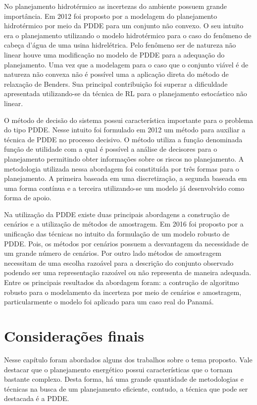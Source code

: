 No planejamento  hidrot\'ermico as incertezas do ambiente possuem grande import\^ancia. Em 2012 foi proposto por
\cite{torres}  a
modelagem do planejamento hidrot\'ermico por meio da PDDE para um conjunto n\~ao convexo. O seu intuito era o
planejamento
utilizando o modelo hidrot\'ermico para o caso do fen\^omeno de cabe\c ca d'\'agua de uma usina hidrel\'etrica. Pelo fen\^omeno ser
de natureza n\~ao linear houve uma modifica\c c\~ao no modelo de PDDE para a adequa\c c\~ao do planejamento. Uma vez que
a
modelagem para o caso que o  conjunto vi\'avel \'e de natureza n\~ao convexa n\~ao \'e poss\'ivel uma a aplica\c c\~ao direta do m\'etodo
de relaxa\c c\~ao de Benders. Sua principal contribui\c c\~ao foi superar a dificuldade apresentada utilizando-se da
t\'ecnica de RL para o planejamento estoc\'astico n\~ao linear. 

O m\'etodo de decis\~ao do sistema possui caracter\'istica importante para o problema do tipo PDDE. Nesse intuito foi
formulado em 2012 \cite{vitor} um m\'etodo para auxiliar a t\'ecnica de PDDE no processo decisivo. O m\'etodo
utiliza a fun\c c\~ao denominada fun\c c\~ao de utilidade com a qual \'e poss\'ivel a an\'alise de decisores para o
planejamento permitindo obter informa\c c\~oes sobre os riscos no planejamento. A metodologia utilizada nessa abordagem
foi constitu\'ida por tr\^es formas para o planejamento. A primeira baseada em uma discretiza\c c\~ao, a segunda baseada
em uma forma cont\'inua e a terceira utilizando-se um modelo j\'a desenvolvido como forma de apoio.

Na utiliza\c c\~ao da PDDE existe duas principais abordagens a constru\c c\~ao de cen\'arios e a utiliza\c
c\~ao de m\'etodos de amostragem. Em 2016 foi proposto por \cite{Reben} a unifica\c c\~ao das t\'ecnicas no intuito da
formula\c c\~ao de um modelo robusto de PDDE. Pois, os m\'etodos por cen\'arios possuem a desvantagem da necessidade de
um grande n\'umero de cen\'arios. Por outro lado m\'etodos de amostragem necessitam de uma escolha razo\'avel para a
descri\c c\~ao do conjunto observado podendo ser uma representa\c c\~ao razo\'avel ou  n\~ao representa de maneira
adequada. Entre os principais resultados da abordagem foram: a contru\c c\~ao de algoritmo robusto para o modelamento da
incerteza por meio de cen\'arios e amostragem, particularmente o modelo foi aplicado para um caso real do Panam\'a.

\section{Considera\c c\~oes finais}
Nesse cap\'itulo foram abordados alguns dos trabalhos sobre o tema proposto. Vale destacar que o planejamento energ\'etico possui
caracter\'isticas que o tornam bastante complexo. Desta forma, h\'a uma grande quantidade de metodologias e t\'ecnicas na
busca de um planejamento eficiente, contudo, a t\'ecnica que pode ser destacada \'e a PDDE.  
